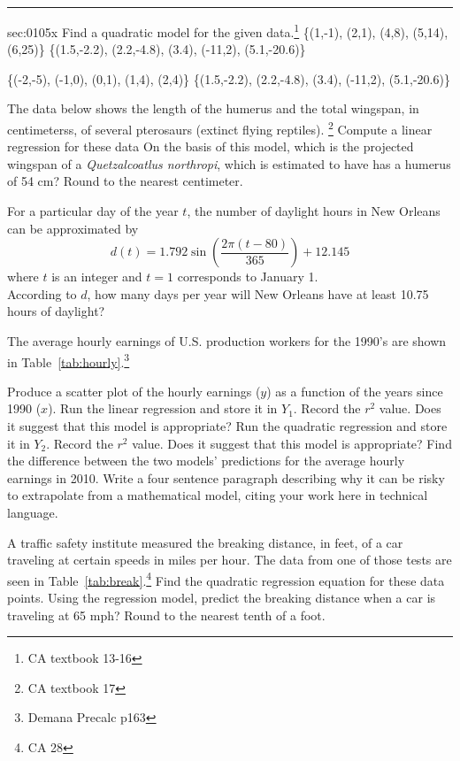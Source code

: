 \renewcommand{\columnseprule}{1.5pt}
\begin{multicols*}{2}
\rule[0.5\baselineskip]{0.4\textwidth}{1pt}
\noindent%
\ExSection\label{sec:0105x}
\begin{exercises}{sec:0105x}
\prob[0105Quad1] Find a quadratic model for the given data.\footnote{CA textbook 13-16}
\subprob \{(1,-1), (2,1), (4,8), (5,14), (6,25)\}
\subprob \{(1.5,-2.2), (2.2,-4.8), (3.4), (-11,2), (5.1,-20.6)\}

\prob[0105Quad2]
\subprob \{(-2,-5), (-1,0), (0,1), (1,4), (2,4)\}
\subprob \{(1.5,-2.2), (2.2,-4.8), (3.4), (-11,2), (5.1,-20.6)\}

\prob[0105Arch] The data below shows the length of the humerus and the total wingspan, in
centimeterss, of several pterosaurs (extinct flying reptiles). \footnote{CA textbook 17}
\subprob Compute a linear regression for these data
\subprob On the basis of this model, which is the projected wingspan of a 
\textit{Quetzalcoatlus northropi}, which is estimated to have has a humerus of 54 cm?  
Round to the nearest centimeter.



\prob[0105ModelDay] For a particular day of the year $t$, the number of 
daylight hours in New Orleans can be approximated by 
$$
d(t)=1.792\sin\left(\dfrac{2\pi(t-80)}{365}\right) + 12.145
$$
where $t$ is an integer and $t=1$ corresponds to January 1.\\ According to $d$, 
how many days per year will New Orleans have at least 10.75 hours of daylight?



\prob[0105Hourly] The average hourly earnings of U.S. production
workers for the 1990's are shown in Table~\ref{tab:hourly}.\footnote{Demana Precalc p163}


\subprob Produce a scatter plot of the hourly earnings ($y$) as a function
of the years since 1990 ($x$).
\subprob Run the linear regression and store it in $Y_1$.
\subprob Record the $r^2$ value.  Does it suggest that this model is appropriate?
\subprob Run the quadratic regression and store it in $Y_2$.
\subprob Record the $r^2$ value.  Does it suggest that this model is appropriate?
\subprob Find the difference between the two models' predictions for the average hourly earnings in 2010.
\subprob Write a four sentence paragraph describing why it can be risky to extrapolate from a mathematical
model, citing your work here in technical language.


\prob[0105traffic]
A traffic safety institute measured the breaking
distance, in feet, of a car traveling at certain speeds in miles per hour.
The data from one of those tests are seen in Table~\ref{tab:break}.\footnote{CA 28}
\subprob Find the quadratic regression equation for these data points.
\subprob Using the regression model, predict the breaking distance
when a car is traveling at 65 mph?  Round to the nearest tenth
of a foot.



\end{exercises}
\end{multicols*}

